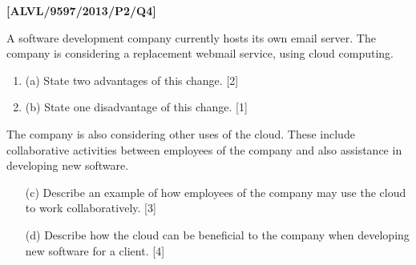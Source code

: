 \item \textbf{{[}ALVL/9597/2013/P2/Q4{]} }

A software development company currently hosts its own email server.
The company is considering a replacement webmail service, using cloud
computing.
\begin{enumerate}
\item (a) State two advantages of this change.\hfill{} {[}2{]}
\item (b) State one disadvantage of this change. \hfill{}{[}1{]}
\end{enumerate}
The company is also considering other uses of the cloud. These include
collaborative activities between employees of the company and also
assistance in developing new software.
\begin{enumerate}
\item[(c)]  Describe an example of how employees of the company may use the
cloud to work collaboratively.\hfill{} {[}3{]}
\item[(d)]  Describe how the cloud can be beneficial to the company when developing
new software for a client. \hfill{}{[}4{]}
\end{enumerate}